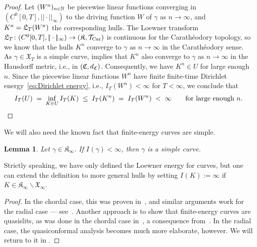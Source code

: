 \documentclass[a4paper, 11pt]{article}
\newtheorem{lemA}[theorem]{Lemma}
\theoremstyle{definition}
\numberwithin{equation}{section}
\numberwithin{figure}{section}
\newcommand{\LLoewnerTransform}[1][]{\mathfrak{L}_{\ifx&#1&\else#1\fi}}
\newcommand{\BMenergy}[1][]{I_{#1}}%
\newcommand{\Xlenergy}[1][]{I_{#1}}
\newcommand{\funs}[2][]{C^{0}_{#1}[0,#2}
\newcommand{\Khulls}[1][]{\mathfrak{K}_{#1}}
\newcommand{\Xpaths}[1][]{\mathfrak{X}_{#1}}
\newcommand{\dCcompsets}{d_{\Ccompsets}}
\newcommand{\norm}[1]{|\!|#1|\!|}
\newcommand{\normUniform}[1]{\norm{#1}_\infty}
\begin{document}
\begin{proof}
Let $(W^{n})_{n \in \mathbb{N}}$ be piecewise linear functions converging in $(\funs{T]},\normUniform{\cdot})$ to the driving function $W$ of $\gamma$ as $n \to \infty$, and $K^{n} = \LLoewnerTransform[T](W^{n})$ the corresponding hulls. 
The Loewner transform $\LLoewnerTransform[T] \colon (\funs{T]},\normUniform{\cdot}) \to (\Khulls, \cT_{\textnormal{Car}})$ is continuous for the Carath\'eodory topology, 
so we know that the hulls $K^{n}$ converge to $\gamma$ as $n \to \infty$ in the Carath\'eodory sense. 
As $\gamma \in \Xpaths[T]$ is a simple curve,  implies that 
$K^{n}$ also converge to $\gamma$ as $n \to \infty$ in the Hausdorff metric, i.e., in $(\Ccompsets,\dCcompsets)$.
Consequently, we have $K^{n} \in U$ for large enough $n$. 
Since the piecewise linear functions $W^{n}$ have finite finite-time Dirichlet energy~\eqref{eq:Dirichlet energy}, 
i.e., $\BMenergy[T](W^{n}) < \infty$ for $T < \infty$, 
we conclude that
\begin{align*}
\Xlenergy[T](U) \; = \;  \inf_{K \in U} \Xlenergy[T](K) 
\; \le \; \Xlenergy[T](K^{n}) \; = \; \BMenergy[T](W^{n}) \; < \; \infty \qquad \textnormal{for large enough } n .
\end{align*}
\end{proof}

We will also need the known fact that finite-energy curves are simple.

\begin{lemA}\label{thm:finite-energy-is-simple}
Let $\gamma \in \Khulls[\infty]$. If $\Xlenergy[](\gamma) < \infty$, then $\gamma$ is a simple curve.
\end{lemA}
Strictly speaking, we have only defined the Loewner energy for curves, 
but one can extend the definition to more general hulls by setting $\Xlenergy[](K) := \infty$ 
if $K \in \Khulls[\infty] \smallsetminus \Xpaths[\infty]$.  

\begin{proof}
In the chordal case, this was proven in~\cite[Theorem~2(ii)]{Friz-Shekhar:Finite_energy_drivers},
and similar arguments work for the radial case --- 
see~\cite[Theorem~3.9]{AHP:Large_deviations_of_DBM_and_multiradial_SLE}.
Another approach is to show that finite-energy curves are quasislits, 
as was done in the chordal case in~\cite[Proposition~2.1]{Wang:Energy_of_deterministic_Loewner_chain}, 
a consequence from~\cite{Marshall-Rohde:The_loewner_differential_equation_and_slit_mappings,LMR:Collisions_and_spirals_of_Loewner_traces}. 
In the radial case, the quasiconformal analysis becomes much more elaborate, however.
We will return to it in \cite{AP:In_Prep}.
\end{proof}
\end{document}
